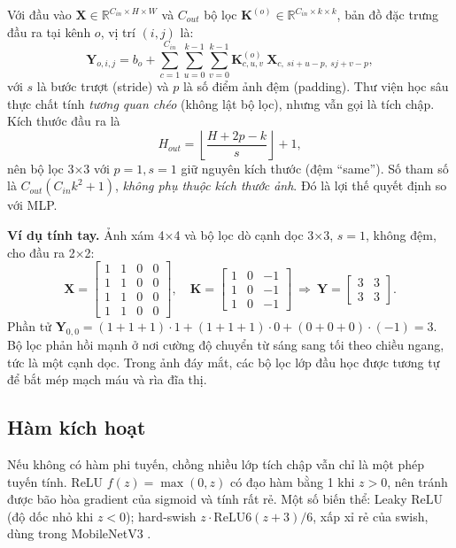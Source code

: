 Với đầu vào $\mathbf X\in\mathbb R^{C_{in}\times H\times W}$ và $C_{out}$ bộ lọc $\mathbf K^{(o)}\in\mathbb R^{C_{in}\times k\times k}$, bản đồ đặc trưng đầu ra tại kênh $o$, vị trí $(i,j)$ là:
\begin{equation}
\mathbf Y_{o,i,j} = b_o + \sum_{c=1}^{C_{in}}\sum_{u=0}^{k-1}\sum_{v=0}^{k-1} \mathbf K^{(o)}_{c,u,v}\ \mathbf X_{c,\ s i + u - p,\ s j + v - p},
\label{eq:conv}
\end{equation}
với $s$ là bước trượt (stride) và $p$ là số điểm ảnh đệm (padding). Thư viện học sâu thực chất tính \emph{tương quan chéo} (không lật bộ lọc), nhưng vẫn gọi là tích chập. Kích thước đầu ra là
\begin{equation}
H_{out} = \left\lfloor \frac{H + 2p - k}{s}\right\rfloor + 1 ,
\label{eq:convsize}
\end{equation}
nên bộ lọc 3×3 với $p=1, s=1$ giữ nguyên kích thước (đệm ``same''). Số tham số là $C_{out}(C_{in}k^2 + 1)$, \emph{không phụ thuộc kích thước ảnh}. Đó là lợi thế quyết định so với MLP.

\textbf{Ví dụ tính tay.} Ảnh xám 4×4 và bộ lọc dò cạnh dọc 3×3, $s=1$, không đệm, cho đầu ra 2×2:
\[
\mathbf X=\begin{bmatrix}1&1&0&0\\1&1&0&0\\1&1&0&0\\1&1&0&0\end{bmatrix},\quad
\mathbf K=\begin{bmatrix}1&0&-1\\1&0&-1\\1&0&-1\end{bmatrix}
\ \Rightarrow\
\mathbf Y=\begin{bmatrix}3&3\\3&3\end{bmatrix}.
\]
Phần tử $\mathbf Y_{0,0} = (1+1+1)\cdot 1 + (1+1+1)\cdot 0 + (0+0+0)\cdot(-1) = 3$. Bộ lọc phản hồi mạnh ở nơi cường độ chuyển từ sáng sang tối theo chiều ngang, tức là một cạnh dọc. Trong ảnh đáy mắt, các bộ lọc lớp đầu học được tương tự để bắt mép mạch máu và rìa đĩa thị.

\subsection{Hàm kích hoạt}

Nếu không có hàm phi tuyến, chồng nhiều lớp tích chập vẫn chỉ là một phép tuyến tính. ReLU $f(z)=\max(0,z)$ có đạo hàm bằng 1 khi $z>0$, nên tránh được bão hòa gradient của sigmoid và tính rất rẻ. Một số biến thể: Leaky ReLU (độ dốc nhỏ khi $z<0$); hard-swish $z\cdot\mathrm{ReLU6}(z+3)/6$, xấp xỉ rẻ của swish, dùng trong MobileNetV3 \cite{howard2019}.

